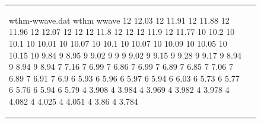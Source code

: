 
\begin{figure}[htbp]
    \centering
    \begin{tabular}{ll}
        \begin{filecontents*}{wthm-wwave.dat}
            wthm    wwave
            12  12.03
            12	11.91
            12	11.88
            12	11.96
            12	12.07
            12	12
            12	11.8
            12	12
            12	11.9
            12	11.77
            10	10.2
            10	10.1
            10	10.01
            10	10.07
            10	10.1
            10	10.07
            10	10.09
            10	10.05
            10	10.15
            10	9.84
            9	8.95
            9	9.02
            9	9
            9	9.02
            9	9.15
            9	9.28
            9	9.17
            9	8.94
            9	8.94
            9	8.94
            7	7.16
            7	6.99
            7	6.86
            7	6.99
            7	6.89
            7	6.85
            7	7.06
            7	6.89
            7	6.91
            7	6.9
            6	5.93
            6	5.96
            6	5.97
            6	5.94
            6	6.03
            6	5.73
            6	5.77
            6	5.76
            6	5.94
            6	5.79
            4	3.908
            4	3.984
            4	3.969
            4	3.982
            4	3.978
            4	4.082
            4	4.025
            4	4.051
            4	3.86
            4	3.784            
        \end{filecontents*}
    

\end{tabular}
\end{figure}
